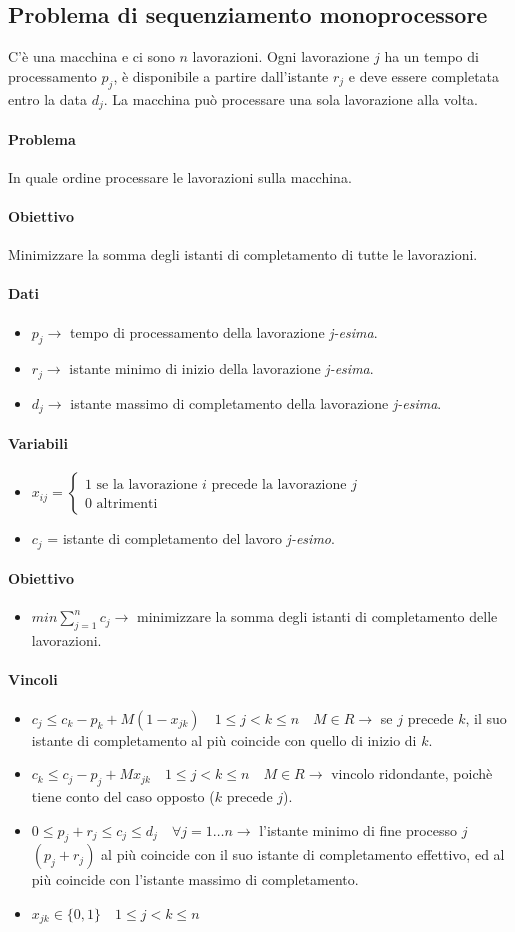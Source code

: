 \documentclass[12pt, twoside, letterpaper]{article}
\newcommand{\casi}[3]{
	$#1 = \begin{cases} \text{#2} \\ \text{#3} \end{cases}$
}
\newcommand{\problemai}[5]{
	#1
	\begin{dati}
		\paragraph{Dati} 
			\begin{itemize}
				#2
			\end{itemize}
	\end{dati}
	\begin{variabili}
		\paragraph{Variabili} 
			\begin{itemize}
				#3
			\end{itemize}
	\end{variabili}
	\begin{obiettivo}
		\paragraph{Obiettivo} 
			\begin{itemize}
				#4
			\end{itemize}
	\end{obiettivo}
	\begin{vincoli}
		\paragraph{Vincoli}
			\begin{itemize}
				#5
			\end{itemize}
	\end{vincoli}
}
\begin{document}
		\subsection{Problema di sequenziamento monoprocessore}
			\problemai{
				C'è una macchina e ci sono $n$ lavorazioni. Ogni lavorazione $j$ ha un tempo di processamento $p_j$, è disponibile a partire dall'istante $r_j$ e deve essere completata entro la data $d_j$. La macchina può processare una sola lavorazione alla volta. 
				
				\paragraph{Problema} In quale ordine processare le lavorazioni sulla macchina.
				\paragraph{Obiettivo} Minimizzare la somma degli istanti di completamento di tutte le lavorazioni.
			}{
				\item $p_j \rightarrow$ tempo di processamento della lavorazione \textit{j-esima}.
				\item $r_j \rightarrow$ istante minimo di inizio della lavorazione \textit{j-esima}.
				\item $d_j \rightarrow$ istante massimo di completamento della lavorazione \textit{j-esima}.
			}{
				\item \casi{x_{ij}}{1 se la lavorazione $i$ precede la lavorazione $j$}{0 altrimenti}
				\item $c_j$ = istante di completamento del lavoro \textit{j-esimo}.
			}{
				\item $min \sum_{j=1}^n c_j \rightarrow$ minimizzare la somma degli istanti di completamento delle lavorazioni.
			}{
				\item $c_j \leq c_k - p_k + M (1-x_{jk}) \quad 1 \leq j < k \leq n \quad M \in R \rightarrow$ se $j$ precede $k$, il suo istante di completamento al più coincide con quello di inizio di $k$.
				\item $c_k \leq c_j - p_j + M x_{jk} \quad 1 \leq j < k \leq n \quad M \in R \rightarrow$ vincolo ridondante, poichè tiene conto del caso opposto ($k$ precede $j$).
				\item $0 \leq p_j + r_j \leq c_j \leq d_j \quad \forall j = 1 \dots n \rightarrow$ l'istante minimo di fine processo $j$ $(p_j+r_j)$ al più coincide con il suo istante di completamento effettivo, ed al più coincide con l'istante massimo di completamento.
				\item $x_{jk} \in \{0,1\} \quad 1 \leq j < k \leq n$
			}
			
\end{document}
